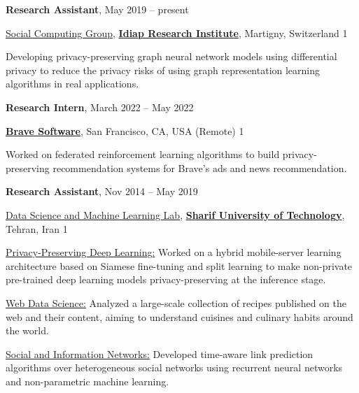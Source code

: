 \documentclass[8pt]{article}
\newcommand{\halfblankline}{\quad\vspace{-0.5\baselineskip}\pagebreak[3]}
\def\longversion{1}  %
\begin{document}
\halfblankline


\textbf{Research Assistant}, {May 2019 -- present}
\begin{innerlist}
    \item[] \href{https://www.idiap.ch/en/scientific-research/social-computing/index_html}{Social Computing Group}, \textbf{\href{https://idiap.ch}{Idiap Research Institute}}, Martigny, Switzerland
    \if\longversion1
    \begin{innerlist}
    	\item Developing privacy-preserving graph neural network models using differential privacy to reduce the privacy risks of using graph representation learning algorithms in real applications.
    \end{innerlist}
  	\fi
\end{innerlist}

\halfblankline

\textbf{Research Intern}, {March 2022 -- May 2022}
\begin{innerlist}
    \item[] \textbf{\href{https://brave.com/}{Brave Software}}, San Francisco, CA, USA (Remote)
    \if\longversion1
    \begin{innerlist}
    	\item Worked on federated reinforcement learning algorithms to build privacy-preserving recommendation systems for Brave's ads and news recommendation.
    \end{innerlist}
  	\fi
\end{innerlist}

\halfblankline


\textbf{Research Assistant}, {Nov 2014 -- May 2019}
\begin{innerlist}
	\item[] \href{http://dml.ce.sharif.edu/}{Data Science and Machine Learning Lab}, \href{http://www.en.sharif.edu/}{\textbf{Sharif University of Technology}}, Tehran, Iran
	\if\longversion1
	\begin{innerlist}
		\item \underline{Privacy-Preserving Deep Learning:} Worked on a hybrid mobile-server learning architecture based on Siamese fine-tuning and split learning to make non-private pre-trained deep learning models privacy-preserving at the inference stage.
		\item \underline{Web Data Science:} Analyzed a large-scale collection of recipes published on the web and their content, aiming to understand cuisines and culinary habits around the world.
		\item \underline{Social and Information Networks:} Developed time-aware link prediction algorithms over heterogeneous social networks using recurrent neural networks and non-parametric machine learning.
	\end{innerlist}
	\fi
\end{innerlist}
\end{document}

